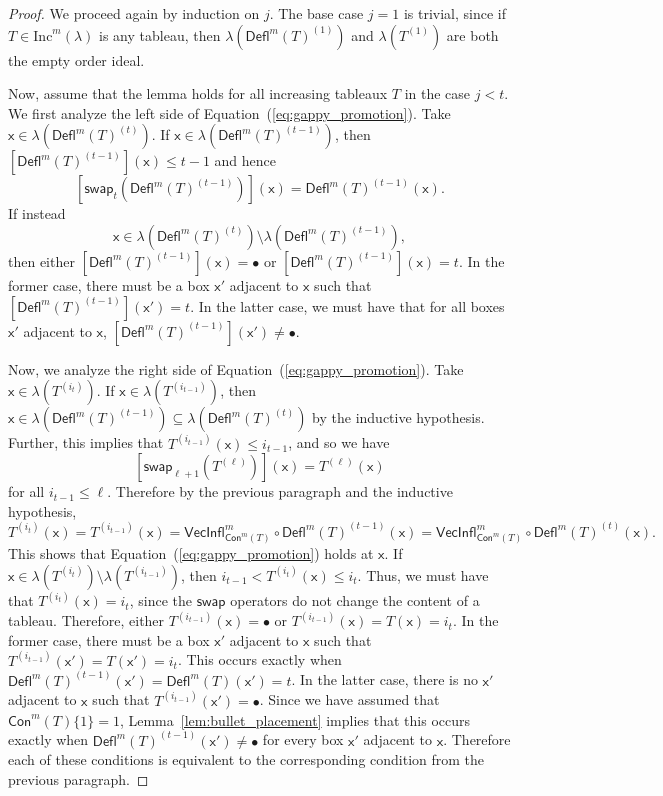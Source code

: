 \documentclass[12pt]{amsart}
\newcommand{\x}{\ensuremath{\mathsf{x}}}
\theoremstyle{definition}
\theoremstyle{remark}
\numberwithin{equation}{section}
\renewcommand{\emptyset}{\varnothing}
\newcommand{\inc}{\ensuremath{\mathrm{Inc}}}
\newcommand{\swap}{\ensuremath{\mathsf{swap}}}
\newcommand{\rep}{\ensuremath{\mathsf{Rep}}}
\newcommand{\deflate}{\ensuremath{\mathsf{Defl}}}
\newcommand{\inflate}{\ensuremath{\mathsf{VecInfl}}}
\newcommand{\content}{\ensuremath{\mathsf{Con}}}
\begin{document}
\begin{proof}  We proceed again by induction on $j$. The base case $j=1$ is trivial, since if $T \in \inc^m(\lambda)$ is any tableau, then $\lambda \left( \deflate^m(T)^{(1)} \right)$ and $\lambda \left( T^{(1)} \right)$ are both the empty order ideal.

Now, assume that the lemma holds for all increasing tableaux $T$ in the case $j < t$. We first analyze the left side of Equation~(\ref{eq:gappy_promotion}). Take $\x \in \lambda\left( \deflate^m(T)^{(t)} \right)$. If $\x \in \lambda\left( \deflate^m(T)^{(t-1)} \right)$, then 
$[\deflate^m(T)^{(t-1)}](\x) \leq t-1$ and hence
\[
\left[ \swap_{t}(\deflate^m(T)^{(t-1)})\right](\x) = \deflate^m(T)^{(t-1)}(\x).
\]
 If instead
 \[\x \in \lambda\left(\deflate^m(T)^{(t)}\right) \setminus \lambda\left(\deflate^m(T)^{(t-1)}\right),\]
  then either $[\deflate^m(T)^{(t-1)}](\x) = \bullet$ or $[\deflate^m(T)^{(t-1)}](\x) = t$. In the former case, there must be a box $\x'$ adjacent to $\x$ such that $[\deflate^m(T)^{(t-1)}](\x') = t$. In the latter case, we must have that for all boxes $\x'$ adjacent to $\x$, $[\deflate^m(T)^{(t-1)}](\x') \neq \bullet$. 

Now, we analyze the right side of Equation~(\ref{eq:gappy_promotion}). Take $\x \in \lambda\left( T^{(i_t)} \right)$.   If $\x \in \lambda \left(T^{(i_{t-1})} \right)$, then $\x \in \lambda(\deflate^m(T)^{(t-1)}) \subseteq \lambda(\deflate^m(T)^{(t)})$ by the inductive hypothesis. Further, this implies that $T^{(i_{t-1})}(\x) \leq i_{t-1}$,  and so we have
\[
\left[ \swap_{\ell+1} \left(T^{(\ell)} \right) \right](\x) = T^{(\ell)}(\x)
\]
 for all $i_{t-1} \leq \ell$. Therefore by the previous paragraph and the inductive hypothesis,
 \[ T^{(i_t)}(\x) = T^{(i_{t-1})}(\x) = \inflate^m_{\content^m(T)} \circ \deflate^m(T)^{(t-1)}(\x) =  \inflate^m_{\content^m(T)} \circ \deflate^m(T)^{(t)}(\x). \] This shows that Equation~(\ref{eq:gappy_promotion}) holds at $\x$. If $\x \in \lambda \left(T^{(i_{t})} \right) \setminus \lambda \left(T^{(i_{t-1})} \right)$, then $i_{t-1} < T^{(i_{t})}(\x) \leq i_t$. Thus, we must have that $T^{(i_{t})}(\x) = i_{t}$, since the $\swap$ operators do not change the content of a tableau. Therefore, either $T^{(i_{t-1})}(\x) = \bullet$ or $T^{(i_{t-1})}(\x) =  T(\x) = i_{t}$. In the former case, there must be a box $\x'$ adjacent to $\x$ such that $T^{(i_{t-1})}(\x') = T(\x') = i_{t}$. This occurs exactly when $\deflate^m(T)^{(t-1)}(\x') = \deflate^m(T)(\x') = t$. In the latter case, there is no $\x'$ adjacent to $\x$ such that $T^{(i_{t-1})}(\x') = \bullet$. Since we have assumed that  $\content^m(T) \lbrace 1 \rbrace = 1$, Lemma~\ref{lem:bullet_placement} implies that this occurs exactly when  $\deflate^m(T)^{(t-1)}(\x') \neq \bullet$ for every box $\x'$ adjacent to $\x$. Therefore each of these conditions is equivalent to the corresponding condition from the previous paragraph. 
 

\end{proof}
\end{document}
